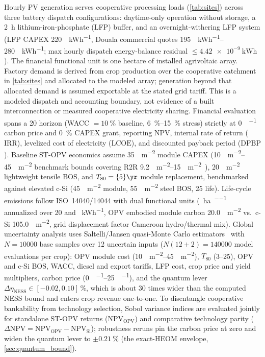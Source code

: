 \documentclass[preprint,12pt,a4paper]{elsarticle}
\begin{document}
Hourly PV generation serves cooperative processing loads (\cref{tab:sites}) across three battery dispatch configurations: daytime-only operation without storage, a \qty{2}{\hour} lithium-iron-phosphate (LFP) buffer, and an overnight-withering LFP system (LFP CAPEX \qty{220}{\USD\per\kWh}, Douala commercial quotes \qtyrange{195}{280}{\USD\per\kWh}; max hourly dispatch energy-balance residual $\le \qty{4.42e-9}{\kWh}$). The financial functional unit is one hectare of installed agrivoltaic array. Factory demand is derived from crop production over the cooperative catchment in \cref{tab:sites} and allocated to the modeled array; generation beyond that allocated demand is assumed exportable at the stated grid tariff. This is a modeled dispatch and accounting boundary, not evidence of a built interconnection or measured cooperative electricity sharing. Financial evaluation spans a \qty{20}{\yr} horizon (WACC $= \qty{10}{\percent}$ baseline, \qtyrange{6}{15}{\percent} stress) strictly at \qty{0}{\USD\per\tCOtwoe} carbon price and \qty{0}{\percent} CAPEX grant, reporting NPV, internal rate of return ($\mathrm{IRR}$), levelized cost of electricity ($\mathrm{LCOE}$), and discounted payback period ($\mathrm{DPBP}$). Baseline ST-OPV economics assume \qty{35}{\USD\per\square\meter} module CAPEX (\qtyrange{10}{45}{\USD\per\square\meter} benchmark bounds covering R2R \qtyrange{9.2}{15}{\USD\per\square\meter}~\cite{Machui2014,Gambhir2016}), \qty{20}{\USD\per\square\meter} lightweight tensile BOS, and $T_{80}=\qty{5}{\yr}$ module replacement, benchmarked against elevated c-Si (\qty{45}{\USD\per\square\meter} module, \qty{55}{\USD\per\square\meter} steel BOS, \qty{25}{\yr} life). Life-cycle emissions follow ISO~14040/14044 with dual functional units (\unit{\kgCOtwoe\per\hectare\per\yr} annualized over \qty{20}{\yr} and \unit{\gCOtwoe\per\kWh}, OPV embodied module carbon \qty{20.0}{\kgCOtwoe\per\square\meter} vs.\ c-Si \qty{105.0}{\kgCOtwoe\per\square\meter}, grid displacement factor Cameroon hydro/thermal mix). Global uncertainty analysis uses Saltelli/Jansen quasi-Monte Carlo estimators~\cite{Sobol2001} with $N=\num{10000}$ base samples over \num{12} uncertain inputs ($N(12+2)=\num{140000}$ model evaluations per crop): OPV module cost (\qtyrange{10}{45}{\USD\per\square\meter}), $T_{80}$ (\qtyrange{3}{25}{\yr}), OPV and c-Si BOS, WACC, diesel and export tariffs, LFP cost, crop price and yield multipliers, carbon price (\qtyrange{0}{25}{\USD\per\tCOtwoe}), and the quantum lever $\Delta\eta_{\mathrm{NESS}}\in[\num{-0.02}, \num{+0.10}]\,\unit{\percent}$, which is about \num{30} times wider than the computed NESS bound and enters crop revenue one-to-one. To disentangle cooperative bankability from technology selection, Sobol variance indices are evaluated jointly for standalone ST-OPV returns ($\mathrm{NPV}_{\mathrm{OPV}}$) and comparative technology parity ($\Delta\mathrm{NPV}=\mathrm{NPV}_{\mathrm{OPV}}-\mathrm{NPV}_{\mathrm{Si}}$); robustness reruns pin the carbon price at zero and widen the quantum lever to $\pm \qty{0.21}{\percent}$ (the exact-HEOM envelope, \cref{sec:quantum_bound}).
\end{document}
